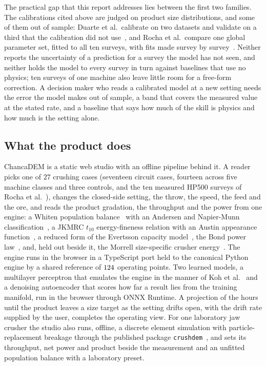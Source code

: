 The practical gap that this report addresses lies between the first two families. The calibrations cited above are
judged on product size distributions, and some of them out of sample: Duarte et al.\ calibrate on two datasets and
validate on a third that the calibration did not use~\cite{duarte2021}, and Rocha et al.\ compare one global parameter
set, fitted to all ten surveys, with fits made survey by survey~\cite{rocha2024}. Neither reports the uncertainty of a prediction for a survey the
model has not seen, and neither holds the model to every survey in turn against baselines that use no physics; ten
surveys of one machine also leave little room for a free-form correction. A decision maker who reads a calibrated model at a new setting needs the error the model makes out of sample, a band that
covers the measured value at the stated rate, and a baseline that says how much of the skill is physics and how much
is the setting alone.

\subsection{What the product does}\label{sec:intro-product}

ChancaDEM is a static web studio with an offline pipeline behind it. A reader picks one of $27$ crushing cases (seventeen
circuit cases, fourteen across five machine classes and three controls, and the ten measured HP500 surveys of Rocha et
al.~\cite{rocha2024}), changes the closed-side setting, the throw, the speed, the feed and the ore, and reads the product
gradation, the throughput and the power from one engine: a Whiten population balance~\cite{whiten1972,napier1996} with an
Andersen and Napier-Munn classification~\cite{andersen1988}, a JKMRC $t_{10}$ energy-fineness relation with an Austin
appearance function~\cite{napier1996,austin1984}, a reduced form of the Evertsson capacity model~\cite{evertsson2000}, the
Bond power law~\cite{bond1952}, and, held out beside it, the Morrell size-specific crusher energy~\cite{morrell2009,gmsg}.
The engine runs in the browser in a TypeScript port held to the canonical Python engine by a shared reference of $124$
operating points. Two learned models, a multilayer perceptron that emulates the engine in the manner of Koh et
al.~\cite{koh2021} and a denoising autoencoder that scores how far a result lies from the training manifold, run in the
browser through ONNX Runtime. A projection of the hours until the product leaves a size target as the setting drifts
open, with the drift rate supplied by the user, completes the operating view. For one laboratory jaw crusher the studio also runs, offline, a discrete element simulation with particle-replacement breakage through the published package \texttt{crushdem}~\cite{crushdem2026,barrios2020}, and sets its throughput, net power and product beside the measurement and an unfitted population balance with a laboratory preset.

